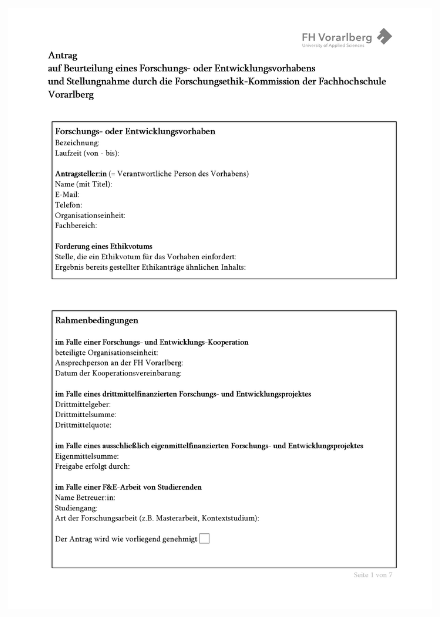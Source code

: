 \documentclass[a4paper,12pt,twoside]{scrreprt}
\begin{document}
\begin{figure}[ht]
    \centering
    \begin{minipage}[t]{.49\linewidth}
        \includegraphics[width=\linewidth]{thesis/images/Luidold_Word-Vorlage-FHV-1.png}
    \end{minipage}
    \begin{minipage}[b]{.49\linewidth}

\end{minipage}
\end{figure}
\end{document}
